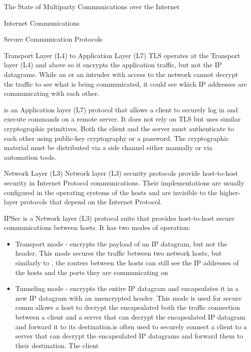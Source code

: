 \begin{frame}[fragile]{The State of Multiparty Communications over the Internet}
\begin{block}{Internet Communications}
\begin{block}{Secure Communication Protocols}
\begin{block}{Transport Layer (L4) to Application Layer (L7)}
TLS operates at the Transport layer (L4) and above so it encrypts the application traffic, but not the IP datagrams. While an  or an intruder with access to the network cannot decrypt the traffic to see what is being communicated, it could see which IP addresses are communicating with each other.

 is an Application layer (L7) protocol that allows a client to securely log in and execute commands on a remote server. It does not rely on TLS but uses similar cryptographic primitives. Both the client and the server must authenticate to each other using public-key cryptography or a password. The cryptographic material must be distributed via a side channel either manually or via automation tools.
\end{block}

\begin{block}{Network Layer (L3)}
\label{thesis__020-internet.md__network-layer-l3-1}
Network layer (L3) security protocols provide host-to-host security in Internet Protocol communications. Their implementations are usually configured in the operating systems of the hosts and are invisible to the higher-layer protocols that depend on the Internet Protocol.

\begin{block}{IPSec}
\label{thesis__020-internet.md__ipsec}
 is a Network layer (L3) protocol suite that provides host-to-host secure communications between  hosts. It has two modes of operation:

\begin{itemize}
\tightlist
\item
  Transport mode - encrypts the payload of an IP datagram, but not the header. This mode secures the traffic between two network hosts, but similarly to , the routers between the hosts can still see the IP addresses of the hosts and the ports they are communicating on
\item
  Tunneling mode - encrypts the entire IP datagram and encapsulates it in a new IP datagram with an unencrypted header. This mode is used for secure comm allows a host to decrypt the encapsulated both the traffic connection between a client and a server that can decrypt the encapsulated IP datagram and forward it to its destination.is often used to securely connect a client to a server that can decrypt the encapsulated IP datagrams and forward them to their destination. The client
\end{itemize}


\end{block}
\end{block}
\end{block}
\end{block}
\end{frame}
